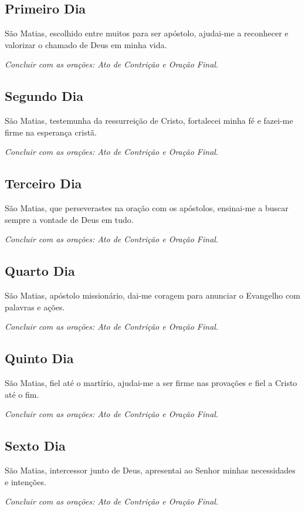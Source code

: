 \documentclass[18pt]{article}
\begin{document}
\subsection*{Primeiro Dia}
São Matias, escolhido entre muitos para ser apóstolo, ajudai-me a reconhecer e valorizar o chamado de Deus em minha vida.

\textit{Concluir com as orações: Ato de Contrição e Oração Final.}

\subsection*{Segundo Dia}
São Matias, testemunha da ressurreição de Cristo, fortalecei minha fé e fazei-me firme na esperança cristã.

\textit{Concluir com as orações: Ato de Contrição e Oração Final.}

\subsection*{Terceiro Dia}
São Matias, que perseverastes na oração com os apóstolos, ensinai-me a buscar sempre a vontade de Deus em tudo.

\textit{Concluir com as orações: Ato de Contrição e Oração Final.}

\subsection*{Quarto Dia}
São Matias, apóstolo missionário, dai-me coragem para anunciar o Evangelho com palavras e ações.

\textit{Concluir com as orações: Ato de Contrição e Oração Final.}

\subsection*{Quinto Dia}
São Matias, fiel até o martírio, ajudai-me a ser firme nas provações e fiel a Cristo até o fim.

\textit{Concluir com as orações: Ato de Contrição e Oração Final.}

\subsection*{Sexto Dia}
São Matias, intercessor junto de Deus, apresentai ao Senhor minhas necessidades e intenções.

\textit{Concluir com as orações: Ato de Contrição e Oração Final.}
\end{document}
